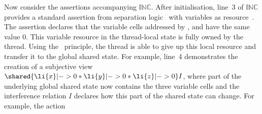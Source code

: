 %		
%    
Now consider the \colosl assertions accompanying  $\mathbb{INC}$.
After
initialisation, line~3 of $\mathbb{INC}$  provides a standard
assertion from separation logic~\cite{seplog} with variables as
resource~\cite{variablesAsResource}. The assertion  declares  that the variable cells
addressed by 
,
 and   have the same value  $0$. This variable resource in the thread-local state is
fully owned by  the thread. Using the \extendRule\ principle, the thread is able to give up  this local
resource and transfer it  to the global shared state. For example,
line~4 demonstrates the
creation of a subjective view $\shared{\li{x}|-> 0 * \li{y}|-> 0 * \li{z}|->
  0}I$, where {part} of the underlying
global shared state now contains the three variable  cells and the 
interference relation $I$ declares  how  this  part of the  shared state can change. For example,  the action 
